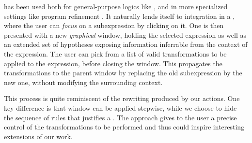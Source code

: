 \begin{scope}
 has been used both for general-purpose logics like 
, and in more specialized settings like program
refinement . It naturally lends itself to
integration in a 
, where the user can
\emph{focus} on a subexpression by clicking on it. One is then presented with a
new \emph{graphical} window, holding the selected expression as well as an
extended set of hypotheses exposing information inferrable from the context of
the expression. The user can pick from a list of valid transformations to be
applied to the expression, before closing the window. This propagates the
transformations to the parent window by replacing the old subexpression by the
new one, without modifying the surrounding context.

This process is quite reminiscent of the rewriting produced by our 
actions. One key difference is that window  can be
applied stepwise, while we choose to hide the sequence of rules that
justifies a . The  approach gives to the user a
precise control of the transformations to be performed and thus could
inspire interesting extensions of our work.




\end{scope}
